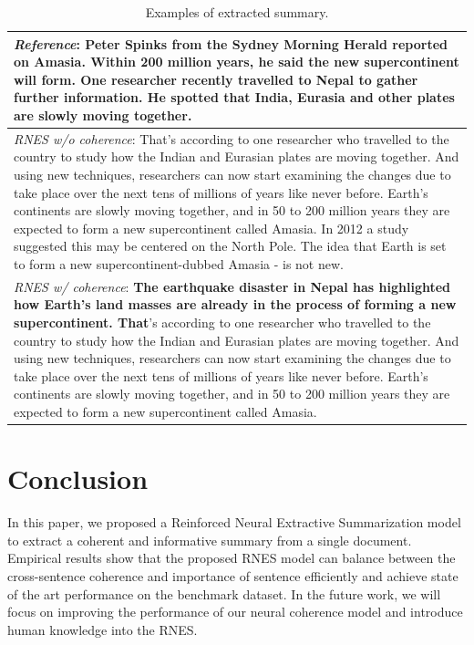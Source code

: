 \documentclass[letterpaper]{article} %
\begin{document}
	\begin{table}[ht]
		\centering
		\caption{Examples of extracted summary.}
		\label{tab:summary_examples}
		
		\begin{tabular}{|p{80mm}|}
			\hline
			\small{\textit{Reference}: Peter Spinks from the Sydney Morning Herald reported on Amasia. Within 200 million years, he said the new supercontinent will form. One researcher recently travelled to Nepal to gather further information. He spotted that India, Eurasia and other plates are slowly moving together.} \\\hline
			
			\small{\textit{RNES w/o coherence}: That's according to one researcher who travelled to the country to study how the Indian and Eurasian plates are moving together. And using new techniques, researchers can now start examining the changes due to take place over the next tens of millions of years like never before. Earth's continents are slowly moving together, and in 50 to 200 million years they are expected to form a new supercontinent called Amasia. In 2012 a study suggested this may be centered on the North Pole. The idea that Earth is set to form a new supercontinent-dubbed Amasia - is not new.}\\\hline

			\small{\textit{RNES w/ coherence}: \textbf{The earthquake disaster in Nepal has highlighted how Earth's land masses are already in the process of forming a new supercontinent. That}'s according to one researcher who travelled to the country to study how the Indian and Eurasian plates are moving together. And using new techniques, researchers can now start examining the changes due to take place over the next tens of millions of years like never before. Earth's continents are slowly moving together, and in 50 to 200 million years they are expected to form a new supercontinent called Amasia.} \\
			\hline
		\end{tabular}
	\end{table}

	\section{Conclusion}	
	In this paper, we proposed a Reinforced Neural Extractive Summarization model to extract a coherent and informative summary from a single document. Empirical results show that the proposed RNES model can balance between the cross-sentence coherence and importance of sentence efficiently and achieve state of the art performance on the benchmark dataset. In the future work, we will focus on improving the performance of our neural coherence model and introduce human knowledge into the RNES.    
	
	\clearpage
	
	
	
\end{document}
